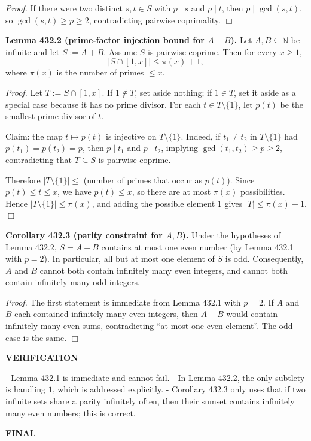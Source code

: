 \noindent\emph{Proof.}
If there were two distinct $s,t\in S$ with $p\mid s$ and $p\mid t$, then $p\mid\gcd(s,t)$, so $\gcd(s,t)\ge p\ge 2$, contradicting pairwise coprimality. \hfill$\Box$

\medskip
\noindent\textbf{Lemma 432.2 (prime-factor injection bound for $A+B$).}
Let $A,B\subseteq\mathbb N$ be infinite and let $S:=A+B$. Assume $S$ is pairwise coprime. Then for every $x\ge 1$,
\[
|S\cap[1,x]|\le \pi(x)+1,
\]
where $\pi(x)$ is the number of primes $\le x$.

\noindent\emph{Proof.}
Let $T:=S\cap[1,x]$. If $1\notin T$, set aside nothing; if $1\in T$, set it aside as a special case because it has no prime divisor. For each $t\in T\setminus\{1\}$, let $p(t)$ be the smallest prime divisor of $t$.

Claim: the map $t\mapsto p(t)$ is injective on $T\setminus\{1\}$. Indeed, if $t_1\ne t_2$ in $T\setminus\{1\}$ had $p(t_1)=p(t_2)=p$, then $p\mid t_1$ and $p\mid t_2$, implying $\gcd(t_1,t_2)\ge p\ge 2$, contradicting that $T\subseteq S$ is pairwise coprime.

Therefore $|T\setminus\{1\}|\le$ (number of primes that occur as $p(t)$). Since $p(t)\le t\le x$, we have $p(t)\le x$, so there are at most $\pi(x)$ possibilities. Hence $|T\setminus\{1\}|\le \pi(x)$, and adding the possible element $1$ gives $|T|\le \pi(x)+1$. \hfill$\Box$

\medskip
\noindent\textbf{Corollary 432.3 (parity constraint for $A,B$).}
Under the hypotheses of Lemma 432.2, $S=A+B$ contains at most one even number (by Lemma 432.1 with $p=2$). In particular, all but at most one element of $S$ is odd. Consequently, $A$ and $B$ cannot both contain infinitely many even integers, and cannot both contain infinitely many odd integers.

\noindent\emph{Proof.}
The first statement is immediate from Lemma 432.1 with $p=2$. If $A$ and $B$ each contained infinitely many even integers, then $A+B$ would contain infinitely many even sums, contradicting ``at most one even element''. The odd case is the same. \hfill$\Box$

\medskip
\noindent\textbf{VERIFICATION}

- Lemma 432.1 is immediate and cannot fail.
- In Lemma 432.2, the only subtlety is handling $1$, which is addressed explicitly.
- Corollary 432.3 only uses that if two infinite sets share a parity infinitely often, then their sumset contains infinitely many even numbers; this is correct.

\medskip
\noindent\textbf{FINAL}

